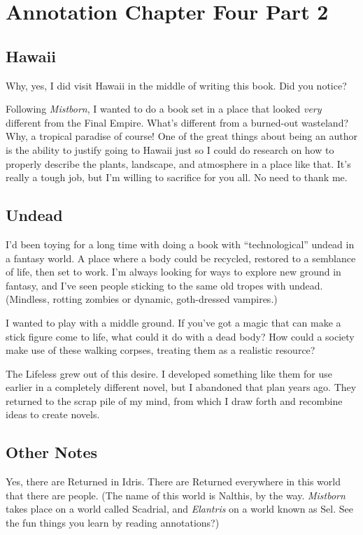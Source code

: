 \section{Annotation Chapter Four Part 2}

\subsection*{Hawaii}

Why, yes, I did visit Hawaii in the middle of writing this book. Did you notice?

Following \textit{Mistborn}, I wanted to do a book set in a place that looked \textit{very} different from the Final Empire. What’s different from a burned-out wasteland? Why, a tropical paradise of course! One of the great things about being an author is the ability to justify going to Hawaii just so I could do research on how to properly describe the plants, landscape, and atmosphere in a place like that. It’s really a tough job, but I’m willing to sacrifice for you all. No need to thank me.

\subsection*{Undead}

I’d been toying for a long time with doing a book with “technological” undead in a fantasy world. A place where a body could be recycled, restored to a semblance of life, then set to work. I’m always looking for ways to explore new ground in fantasy, and I’ve seen people sticking to the same old tropes with undead. (Mindless, rotting zombies or dynamic, goth-dressed vampires.)

I wanted to play with a middle ground. If you’ve got a magic that can make a stick figure come to life, what could it do with a dead body? How could a society make use of these walking corpses, treating them as a realistic resource?

The Lifeless grew out of this desire. I developed something like them for use earlier in a completely different novel, but I abandoned that plan years ago. They returned to the scrap pile of my mind, from which I draw forth and recombine ideas to create novels.

\subsection*{Other Notes}

Yes, there are Returned in Idris. There are Returned everywhere in this world that there are people. (The name of this world is Nalthis, by the way. \textit{Mistborn} takes place on a world called Scadrial, and \textit{Elantris} on a world known as Sel. See the fun things you learn by reading annotations?)

